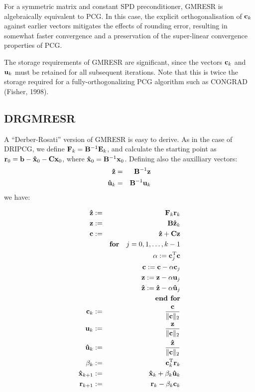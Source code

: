 \documentclass[12pt]{article}
\newcommand{\vect}[1]{{\bf #1}}                         %
\newcommand{\mat}[1]{{\bf #1}}                          %
\newcommand{\rmT}{{\rm T}}                           %
\begin{document}
For a symmetric matrix and constant SPD preconditioner, GMRESR is
algebraically equivalent to PCG. In this case, the explicit
orthogonalisation of $\vect{c}_k$ against earlier vectors mitigates
the effects of rounding error, resulting in somewhat faster convergence
and a preservation of the super-linear convergence properties of PCG.

The storage requirements of GMRESR are significant, since the vectors
$\vect{c}_k$ and $\vect{u}_k$ must be retained for all subsequent
iterations. Note that this is twice the storage required for a
fully-orthogonalizing PCG algorithm such as CONGRAD (Fisher, 1998).

\subsection{DRGMRESR}

A ``Derber-Rosati'' version of GMRESR is easy to derive. As in the case of DRIPCG,
we define $\mat{F}_k = \mat{B}^{-1} \mat{E}_k$, and calculate
the starting point as
$\vect{r}_0 = \vect{b} - \vect{\hat x}_0 - \mat{C}\vect{x}_0$, where
$\vect{\hat x}_0 = \mat{B}^{-1} \vect{x}_0$. Defining also the auxilliary
vectors:
\begin{eqnarray}
  \vect{\hat z} &=& \mat{B}^{-1} \vect{z} \\
  \vect{\hat u}_k &=& \mat{B}^{-1} \vect{u}_k \\
\end{eqnarray}
we have:
\begin{center}
\begin{minipage}{0.8\textwidth}
\begin{eqnarray}
  \vect{\hat z} &:=& \mat{F}_k \vect{r}_k \\
  \vect{z} &:=& \mat{B} \vect{\hat z}_k \\
  \vect{c} &:=& \vect{\hat z} + \mat{C}\vect{z} \\
  && \mbox{\bf for} \quad j = 0,1,\ldots,k-1 \nonumber \\
  && \qquad \alpha := \vect{c}_j^\rmT \vect{c} \\
  && \qquad \vect{c} := \vect{c} - \alpha \vect{c}_j \\
  && \qquad \vect{z} := \vect{z} - \alpha \vect{u}_j \\
  && \qquad \vect{\hat z} := \vect{\hat z} - \alpha \vect{\hat u}_j \\
  && \mbox{\bf end for} \nonumber \\
  \vect{c}_k &:=& \frac{\vect{c}}{\Vert \vect{c} \Vert_2} \\
  \vect{u}_k &:=& \frac{\vect{z}}{\Vert \vect{c} \Vert_2} \\
  \vect{\hat u}_k &:=& \frac{\vect{\hat z}}{\Vert \vect{c} \Vert_2} \\
  \beta_k &:=& \vect{c}_k^\rmT \vect{r}_k \\
  \vect{\hat x}_{k+1} &:=& \vect{\hat x}_k + \beta_k \vect{\hat u}_k \\
  \vect{r}_{k+1} &:=& \vect{r}_k - \beta_k \vect{c}_k
\end{eqnarray}
\end{minipage}
\end{center}
\end{document}
